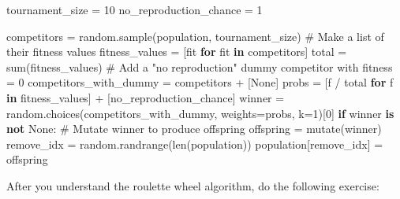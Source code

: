 \documentclass[
  letterpaper,
  DIV=11,
  numbers=noendperiod]{scrreprt}
\newenvironment{Shaded}{\begin{snugshade}}{\end{snugshade}}
\newcommand{\BuiltInTok}[1]{\textcolor[rgb]{0.00,0.23,0.31}{#1}}
\newcommand{\CommentTok}[1]{\textcolor[rgb]{0.37,0.37,0.37}{#1}}
\newcommand{\ControlFlowTok}[1]{\textcolor[rgb]{0.00,0.23,0.31}{\textbf{#1}}}
\newcommand{\DecValTok}[1]{\textcolor[rgb]{0.68,0.00,0.00}{#1}}
\newcommand{\KeywordTok}[1]{\textcolor[rgb]{0.00,0.23,0.31}{\textbf{#1}}}
\newcommand{\NormalTok}[1]{\textcolor[rgb]{0.00,0.23,0.31}{#1}}
\newcommand{\OperatorTok}[1]{\textcolor[rgb]{0.37,0.37,0.37}{#1}}
\newcommand{\VariableTok}[1]{\textcolor[rgb]{0.07,0.07,0.07}{#1}}
\theoremstyle{definition}
\theoremstyle{remark}
\begin{document}
\begin{tcolorbox}[enhanced jigsaw, leftrule=.75mm, colbacktitle=quarto-callout-note-color!10!white, coltitle=black, colback=white, left=2mm, bottomtitle=1mm, arc=.35mm, titlerule=0mm, breakable, bottomrule=.15mm, opacitybacktitle=0.6, colframe=quarto-callout-note-color-frame, title=\textcolor{quarto-callout-note-color}{\faInfo}\hspace{0.5em}{Roulette wheel algorithm}, opacityback=0, toprule=.15mm, toptitle=1mm, rightrule=.15mm]

\begin{Shaded}
\begin{Highlighting}[]
\NormalTok{  tournament\_size }\OperatorTok{=} \DecValTok{10}  
\NormalTok{  no\_reproduction\_chance }\OperatorTok{=} \DecValTok{1}
  
\NormalTok{  competitors }\OperatorTok{=}\NormalTok{ random.sample(population, tournament\_size)}
  \CommentTok{\# Make a list of their fitness values}
\NormalTok{  fitness\_values }\OperatorTok{=}\NormalTok{ [fit }\ControlFlowTok{for}\NormalTok{ fit }\KeywordTok{in}\NormalTok{ competitors]}
\NormalTok{  total }\OperatorTok{=} \BuiltInTok{sum}\NormalTok{(fitness\_values)}
  \CommentTok{\# Add a "no reproduction" dummy competitor with fitness = 0}
\NormalTok{  competitors\_with\_dummy }\OperatorTok{=}\NormalTok{ competitors }\OperatorTok{+}\NormalTok{ [}\VariableTok{None}\NormalTok{]}
\NormalTok{  probs }\OperatorTok{=}\NormalTok{ [f }\OperatorTok{/}\NormalTok{ total }\ControlFlowTok{for}\NormalTok{ f }\KeywordTok{in}\NormalTok{ fitness\_values] }\OperatorTok{+}\NormalTok{ [no\_reproduction\_chance]}
\NormalTok{  winner }\OperatorTok{=}\NormalTok{ random.choices(competitors\_with\_dummy, weights}\OperatorTok{=}\NormalTok{probs, k}\OperatorTok{=}\DecValTok{1}\NormalTok{)[}\DecValTok{0}\NormalTok{]}
  \ControlFlowTok{if}\NormalTok{ winner }\KeywordTok{is} \KeywordTok{not} \VariableTok{None}\NormalTok{:}
      \CommentTok{\# Mutate winner to produce offspring}
\NormalTok{      offspring }\OperatorTok{=}\NormalTok{ mutate(winner)}
\NormalTok{      remove\_idx }\OperatorTok{=}\NormalTok{ random.randrange(}\BuiltInTok{len}\NormalTok{(population))}
\NormalTok{      population[remove\_idx] }\OperatorTok{=}\NormalTok{ offspring  }
        
\end{Highlighting}
\end{Shaded}

\end{tcolorbox}

After you understand the roulette wheel algorithm, do the following
exercise:
\end{document}
